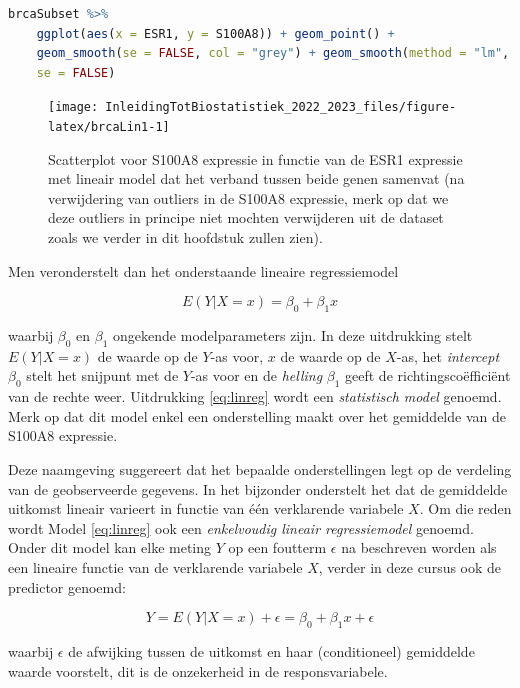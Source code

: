 \documentclass[
  12pt,dutch,coursenotes]{book}
\begin{document}
\begin{lstlisting}[language=R]
brcaSubset %>%
    ggplot(aes(x = ESR1, y = S100A8)) + geom_point() +
    geom_smooth(se = FALSE, col = "grey") + geom_smooth(method = "lm",
    se = FALSE)
\end{lstlisting}

\begin{figure}

{\centering \texttt{[image: InleidingTotBiostatistiek\_2022\_2023\_files/figure-latex/brcaLin1-1]} 

}

\caption{Scatterplot voor S100A8 expressie in functie van de ESR1 expressie met lineair model dat het verband tussen beide genen samenvat (na verwijdering van outliers in de S100A8 expressie, merk op dat we deze outliers in principe niet mochten verwijderen uit de dataset zoals we verder in dit hoofdstuk zullen zien).}\label{fig:brcaLin1}
\end{figure}

Men veronderstelt dan het onderstaande lineaire regressiemodel

\begin{equation}
E(Y|X =x)=\beta_0 + \beta_1 x  \label{eq:linreg}
\end{equation}

waarbij \(\beta_0\) en \(\beta_1\) ongekende modelparameters zijn. In deze uitdrukking
stelt \(E(Y|X=x)\) de waarde op de \(Y\)-as voor, \(x\) de waarde op de \(X\)-as,
het \emph{intercept} \(\beta_0\) stelt het snijpunt met de \(Y\)-as voor en de
\emph{helling} \(\beta_1\) geeft de richtingscoëfficiënt van de rechte weer.
Uitdrukking \eqref{eq:linreg} wordt een \emph{statistisch model} genoemd.
Merk op dat dit model enkel een onderstelling maakt over het gemiddelde van de S100A8 expressie.

Deze naamgeving suggereert dat het bepaalde onderstellingen legt op de
verdeling van de geobserveerde gegevens. In het bijzonder onderstelt het dat
de gemiddelde uitkomst lineair varieert in functie van één verklarende variabele \(X\). Om
die reden wordt Model \eqref{eq:linreg} ook een \emph{enkelvoudig lineair regressiemodel} genoemd.
Onder dit model kan elke meting \(Y\) op een foutterm
\(\epsilon\) na beschreven worden als een lineaire functie van de verklarende
variabele \(X\), verder in deze cursus ook de predictor genoemd:

\[Y=E(Y|X=x)+\epsilon=\beta_0+\beta_1 x+\epsilon\]

waarbij \(\epsilon\) de afwijking tussen de uitkomst en haar (conditioneel)
gemiddelde waarde voorstelt, dit is de onzekerheid in de responsvariabele.
\end{document}
